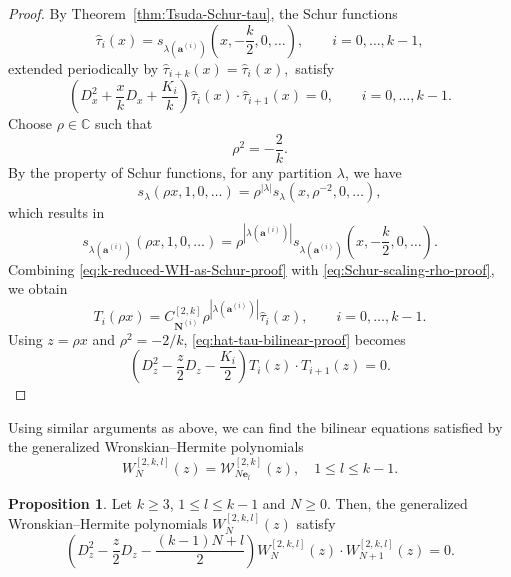 \documentclass[preprint,3p,10pt]{elsarticle}
\theoremstyle{definition}
\newtheorem{proposition}[definition]{Proposition}
\begin{document}
\begin{proof}
By Theorem~\ref{thm:Tsuda-Schur-tau}, the Schur functions
\begin{equation}
\label{eq:hat-tau-k-reduced-proof}
    \widehat \tau_i(x)
    =
    s_{\lambda\left(\mathbf a^{(i)}\right)}
    \left(x,-\frac{k}{2},0,\ldots\right),
    \qquad
    i=0,\ldots,k-1,
\end{equation}
extended periodically by $\widehat\tau_{i+k}(x)=\widehat\tau_i(x),$ satisfy
\begin{equation}\label{eq:hat-tau-bilinear-proof}
    \left(
        D_x^2+\frac{x}{k}D_x+\frac{K_i}{k}
    \right)
    \widehat \tau_i(x)\cdot\widehat \tau_{i+1}(x)=0,
    \qquad
    i=0,\ldots,k-1.
\end{equation}
Choose \(\rho\in\mathbb C\) such that
\begin{equation}
\label{eq:rho-k-reduced-proof}
    \rho^2=-\frac{2}{k}.
\end{equation}
By the property of Schur functions, for any partition \(\lambda\), we have
\begin{equation}
\label{eq:Schur-homogeneity-proof}
    s_{\lambda}(\rho x,1,0,\ldots)
    =
    \rho^{|\lambda|}
    s_{\lambda}\left(x,\rho^{-2},0,\ldots\right),
\end{equation}
which results in
\begin{equation}
\label{eq:Schur-scaling-rho-proof}
    s_{\lambda\left(\mathbf a^{(i)}\right)}(\rho x,1,0,\ldots)
    =
    \rho^{|\lambda\left(\mathbf a^{(i)}\right)|}
    s_{\lambda\left(\mathbf a^{(i)}\right)}
    \left(x,-\frac{k}{2},0,\ldots\right).
\end{equation}
Combining \eqref{eq:k-reduced-WH-as-Schur-proof} with
\eqref{eq:Schur-scaling-rho-proof}, we obtain
\begin{equation}
\label{eq:T-rho-hat-tau-proof}
    T_i(\rho x)
    =
    C_{\mathbf N^{(i)}}^{[2,k]}
    \rho^{|\lambda\left(\mathbf a^{(i)}\right)|}
    \widehat \tau_i(x),
    \qquad
    i=0,\ldots,k-1.
\end{equation}
Using \(z=\rho x\) and \(\rho^2=-2/k\), 
\eqref{eq:hat-tau-bilinear-proof} becomes
\begin{equation}
    \left(
        D_z^2-\frac{z}{2}D_z-\frac{K_i}{2}
    \right)
    T_i(z)\cdot T_{i+1}(z)=0.
\end{equation}
\end{proof}


Using similar arguments as above, we can find the bilinear equations satisfied by the generalized Wronskian--Hermite polynomials
\begin{equation}
    W_N^{[2,k,l]}(z) =\mathcal W_{N\mathbf e_l}^{[2,k]}(z), \quad 1\le l\le k-1.
\end{equation} 
\begin{proposition}
\label{prop:single-block-WH-adjacent-bilinear}
Let \(k\ge3\), \(1\le l\le k-1\) and \(N\ge0\).  Then, the generalized Wronskian--Hermite polynomials \(W_N^{[2,k,l]}(z)\) satisfy
\begin{equation}
\label{eq:single-block-WH-adjacent-z-bilinear}
    \left(
        D_z^2-\frac{z}{2}D_z-\frac{(k-1)N+l}{2}
    \right)
    W_N^{[2,k,l]}(z)\cdot W_{N+1}^{[2,k,l]}(z)=0.
\end{equation}
\end{proposition}
\end{document}
